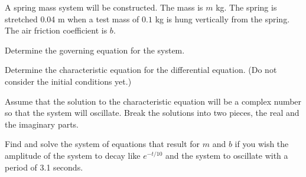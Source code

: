 \begin{problem}
\item A spring mass system will be constructed. The mass is $m$
  kg. The spring is stretched 0.04 m when a test mass of $0.1$ kg 
  is hung vertically from the spring. The air friction coefficient is $b$.

    \begin{subproblem}
      \item Determine the governing equation for the system. 
        \vfill

      \item Determine the characteristic equation for the differential
        equation. (Do not consider the initial conditions yet.)
        \vfill

        \clearpage

      \item Assume that the solution to the characteristic equation
        will be a complex number so that the system will
        oscillate. Break the solutions into two pieces, the real and
        the imaginary parts.

        \vfill

      \item Find and solve the system of equations that result for $m$
        and $b$ if you wish the amplitude of the system to decay like
        $e^{-t/10}$ and the system to oscillate with a period of 3.1
        seconds.

        \vfill

    \end{subproblem}


\end{problem}




